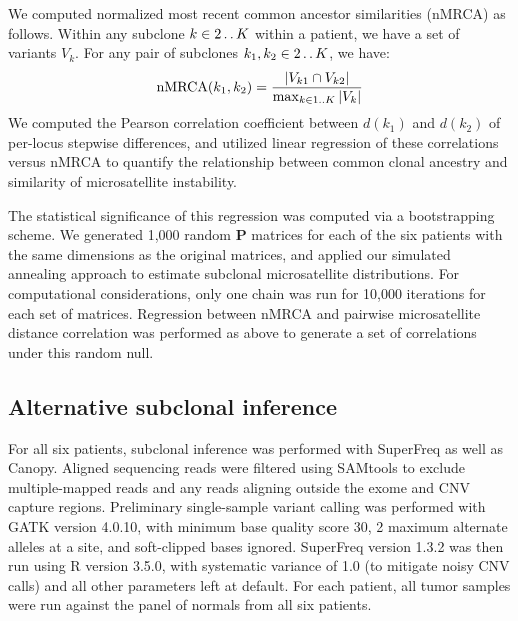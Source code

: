 We computed normalized most recent common ancestor similarities (nMRCA) as follows. Within any subclone $k \in 2 \mathinner {\ldotp \ldotp} K$ within a patient, we have a set of variants $V_k$. For any pair of subclones $k_1, k_2 \in 2 \mathinner {\ldotp \ldotp} K$, we have:
\begin{equation}
    \text{nMRCA}(k_1, k_2) = \frac{|V_{k1} \cap V_{k2}|}{\max_{k \in 1 \mathinner {\ldotp \ldotp} K} |V_k|}
    \label{eqn:msiclones:nmrca}
\end{equation}
We computed the Pearson correlation coefficient between $d(k_1)$ and $d(k_2)$ of per-locus stepwise differences, and utilized linear regression of these correlations versus \mbox{nMRCA} to quantify the relationship between common clonal ancestry and similarity of microsatellite instability.

The statistical significance of this regression was computed via a bootstrapping scheme. We generated 1,000 random $\mathbf{P}$ matrices for each of the six patients with the same dimensions as the original matrices, and applied our simulated annealing approach to estimate subclonal microsatellite distributions. For computational considerations, only one chain was run for 10,000 iterations for each set of matrices. Regression between nMRCA and pairwise microsatellite distance correlation was performed as above to generate a set of correlations under this random null.

\subsection{Alternative subclonal inference}
For all six patients, subclonal inference was performed with SuperFreq \cite{flensburg2020} as well as Canopy. Aligned sequencing reads were filtered using SAMtools to exclude multiple-mapped reads and any reads aligning outside the exome and CNV capture regions. Preliminary single-sample variant calling was performed with GATK version 4.0.10, with minimum base quality score 30, 2 maximum alternate alleles at a site, and soft-clipped bases ignored. SuperFreq version 1.3.2 was then run using R version 3.5.0, with systematic variance of 1.0 (to mitigate noisy CNV calls) and all other parameters left at default. For each patient, all tumor samples were run against the panel of normals from all six patients.

